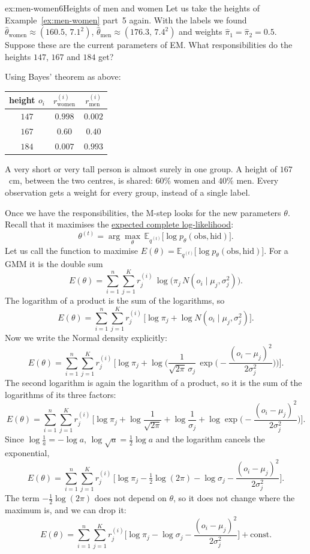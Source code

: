 \documentclass[a4paper,12pt,oneside]{report}
\newcommand{\msteptag}{\casetagbox[TagOrange]{M-step}}
\begin{document}
\begin{framedexamplepart}{ex:men-women}{6}{Heights of men and women}
Let us take the heights of Example~\ref{ex:men-women} part~5 again. With the
labels we found $\hat\theta_{\text{women}}\approx(160.5,\,7.1^2)$,
$\hat\theta_{\text{men}}\approx(176.3,\,7.4^2)$ and weights
$\hat\pi_1=\hat\pi_2=0.5$. Suppose these are the current parameters of EM.
What responsibilities do the heights $147$, $167$ and $184$ get?

Using Bayes' theorem as above:
\begin{center}
\begin{tabular}{ccc}
\toprule
height $o_i$ & $r_{\text{women}}^{(i)}$ & $r_{\text{men}}^{(i)}$\\
\midrule
$147$ & $0.998$ & $0.002$\\
$167$ & $0.60$ & $0.40$\\
$184$ & $0.007$ & $0.993$\\
\bottomrule
\end{tabular}
\end{center}
A very short or very tall person is almost surely in one group. A height of
$167$~cm, between the two centres, is shared: $60\%$ women and $40\%$ men. Every
observation gets a weight for every group, instead of a single label.
\end{framedexamplepart}

\msteptag\par\smallskip
Once we have the responsibilities, the M-step looks for the new parameters
$\theta$. Recall that it maximises the
\hyperref[def:complete-loglik]{expected complete log-likelihood}:
\[
\theta^{(t)}=\arg\max_{\theta}\,\mathbb{E}_{q^{(t)}}\big[\log p_\theta(\text{obs},\text{hid})\big].
\]
Let us call the function to maximise
$E(\theta)=\mathbb{E}_{q^{(t)}}\big[\log p_\theta(\text{obs},\text{hid})\big]$.
For a GMM it is the double sum
\[
E(\theta)=\sum_{i=1}^n\sum_{j=1}^K r_j^{(i)}\,
\log\big(\pi_j\,N(o_i\mid\mu_j,\sigma_j^2)\big).
\]
The logarithm of a product is the sum of the logarithms, so
\[
E(\theta)=\sum_{i=1}^n\sum_{j=1}^K r_j^{(i)}\,
\Big[\log\pi_j+\log N(o_i\mid\mu_j,\sigma_j^2)\Big].
\]
Now we write the Normal density explicitly:
\[
E(\theta)=\sum_{i=1}^n\sum_{j=1}^K r_j^{(i)}\,
\Big[\log\pi_j+\log\Big(\frac{1}{\sqrt{2\pi}\,\sigma_j}\,
\exp\Big(-\frac{(o_i-\mu_j)^2}{2\sigma_j^2}\Big)\Big)\Big].
\]
The second logarithm is again the logarithm of a product, so it is the sum
of the logarithms of its three factors:
\[
E(\theta)=\sum_{i=1}^n\sum_{j=1}^K r_j^{(i)}\,
\Big[\log\pi_j+\log\frac{1}{\sqrt{2\pi}}+\log\frac{1}{\sigma_j}
+\log\exp\Big(-\frac{(o_i-\mu_j)^2}{2\sigma_j^2}\Big)\Big].
\]
Since $\log\frac1a=-\log a$, $\log\sqrt{a}=\tfrac12\log a$ and the logarithm
cancels the exponential,
\[
E(\theta)=\sum_{i=1}^n\sum_{j=1}^K r_j^{(i)}\,
\Big[\log\pi_j-\tfrac12\log(2\pi)-\log\sigma_j
-\frac{(o_i-\mu_j)^2}{2\sigma_j^2}\Big].
\]
The term $-\tfrac12\log(2\pi)$ does not depend on $\theta$, so it does not
change where the maximum is, and we can drop it:
\[
E(\theta)=\sum_{i=1}^n\sum_{j=1}^K r_j^{(i)}\Big[\log\pi_j-\log\sigma_j
-\frac{(o_i-\mu_j)^2}{2\sigma_j^2}\Big]+\text{const}.
\]
\end{document}

